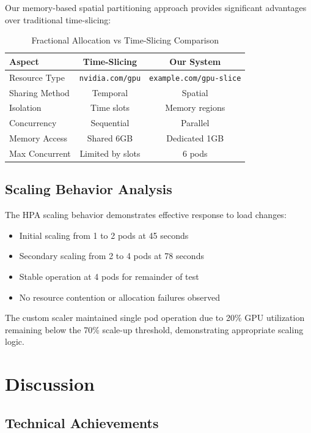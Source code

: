 \documentclass[10pt,twocolumn,letterpaper]{article}
\begin{document}
Our memory-based spatial partitioning approach provides significant advantages over traditional time-slicing:

\begin{table}[!htb]
\centering
\caption{Fractional Allocation vs Time-Slicing Comparison}
\label{tab:comparison}
\begin{tabular}{@{}lcc@{}}
\toprule
\textbf{Aspect} & \textbf{Time-Slicing} & \textbf{Our System} \\
\midrule
Resource Type & \texttt{nvidia.com/gpu} & \texttt{example.com/gpu-slice} \\
Sharing Method & Temporal & Spatial \\
Isolation & Time slots & Memory regions \\
Concurrency & Sequential & Parallel \\
Memory Access & Shared 6GB & Dedicated 1GB \\
Max Concurrent & Limited by slots & 6 pods \\
\bottomrule
\end{tabular}
\end{table}

\subsection{Scaling Behavior Analysis}

The HPA scaling behavior demonstrates effective response to load changes:
\begin{itemize}
\item Initial scaling from 1 to 2 pods at 45 seconds
\item Secondary scaling from 2 to 4 pods at 78 seconds  
\item Stable operation at 4 pods for remainder of test
\item No resource contention or allocation failures observed
\end{itemize}

The custom scaler maintained single pod operation due to 20\% GPU utilization remaining below the 70\% scale-up threshold, demonstrating appropriate scaling logic.

\section{Discussion}

\subsection{Technical Achievements}
\end{document}
